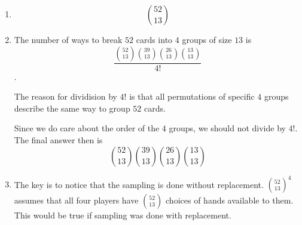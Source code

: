 \begin{enumerate}[label=(\alph*)]
\item $${52 \choose 13}$$

\item The number of ways to break $52$ cards into $4$ groups of size $13$ is 
$$\frac{{52 \choose 13}{39 \choose 13}{26 \choose 13}{13 \choose 13}}{4!}$$.
  
  The reason for dividision by $4!$ is that all permutations of specific $4$ 
  groups describe the same way to group $52$ cards.
  
  Since we do care about the order of the $4$ groups, we should not divide by 
  ${4!}$. The final answer then is 
  $${52 \choose 13}{39 \choose 13}{26 \choose 13}{13 \choose 13}$$

\item The key is to notice that the sampling is done without replacement. 
${52 \choose 13}^{4}$ assumes that all four players have ${52 \choose 13}$ 
choices of hands available to them. This would be true if sampling was done 
with replacement.
\end{enumerate}